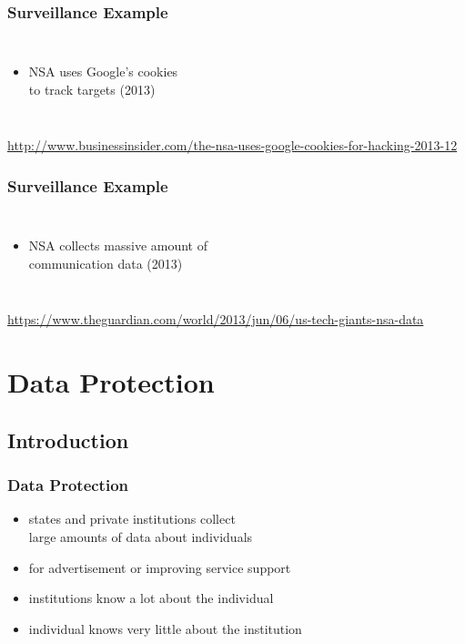 \documentclass[dvipsnames]{beamer}
\theoremstyle{plain}
\begin{document}
\begin{frame}
  \frametitle{Surveillance Example}

  \begin{columns}

    \begin{itemize}
      \item NSA uses Google's cookies\\
        to track targets (2013)
    \end{itemize}
  \end{columns}

  \medskip
  \tiny{\url{http://www.businessinsider.com/the-nsa-uses-google-cookies-for-hacking-2013-12}}\\
\end{frame}

\begin{frame}
  \frametitle{Surveillance Example}

  \begin{columns}

    \begin{itemize}
      \item NSA collects massive amount of\\
        communication data (2013)
    \end{itemize}
  \end{columns}

  \medskip
  \tiny{\url{https://www.theguardian.com/world/2013/jun/06/us-tech-giants-nsa-data}}\\
\end{frame}

\section{Data Protection}

\subsection{Introduction}

\begin{frame}
  \frametitle{Data Protection}

  \begin{itemize}
    \item states and private institutions collect\\
      large amounts of data about individuals
    \item for advertisement or improving service support

    \bigskip
    \item institutions know a lot about the individual
    \item individual knows very little about the institution
  \end{itemize}
\end{frame}
\end{document}

